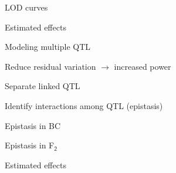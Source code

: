 \documentclass[aspectratio=169,12pt,t]{beamer}
\begin{document}
\begin{frame}[c]{LOD curves}


\note{
}
\end{frame}






\begin{frame}{Estimated effects}


\note{
}
\end{frame}






\begin{frame}{Modeling multiple QTL}

\bbi
\item Reduce residual variation $\longrightarrow$ increased power
\item Separate linked QTL
\item Identify interactions among QTL {\lolit (epistasis)}
\ei
\note{
}
\end{frame}






\begin{frame}[c]{Epistasis in BC}


\note{
}
\end{frame}






\begin{frame}[c]{Epistasis in F$_{\mathsf{2}}$}


\note{
}
\end{frame}











\begin{frame}[c]{Estimated effects}


\note{
}
\end{frame}
\end{document}
